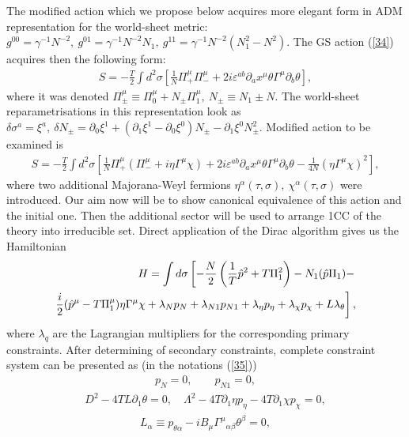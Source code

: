 \documentclass[a4paper]{article}
\begin{document}
The modified action which we propose below acquires more elegant form 
in ADM representation for the world-sheet metric: 
$g^{00}=\gamma^{-1}N^{-2}, ~ 
g^{01}=\gamma^{-1}N^{-2}N_1, ~
g^{11}=\gamma^{-1}N^{-2}(N_1^2-N^2)$. 
The GS action (\ref{34}) acquires then the
following form:
\begin{eqnarray}\label{42}
S=-\frac{T}{2}\int d^2\sigma
\left[\frac{1}{N}
\Pi_+^\mu \Pi_-^\mu+2i\varepsilon^{ab}\partial_ax^\mu
\theta\Gamma^\mu\partial_b\theta\right],
\end{eqnarray}
where it was denoted 
$\Pi^\mu_{\pm}\equiv\Pi_0^\mu+N_{\pm}\Pi_1^\mu, ~ 
N_{\pm}\equiv N_1\pm N$.
The world-sheet reparametrisations in this representation look as 
$\delta\sigma^a=\xi^a, ~  \delta N_{\pm}=\partial_0\xi^1+
(\partial_1\xi^1-
\partial_0\xi^0)N_{\pm}-\partial_1\xi^0N_{\pm}^2$. 
Modified action to be examined is
\begin{eqnarray}\label{44}
S=-\frac{T}{2}\int d^2\sigma
\left[\frac{1}{N}
\Pi_+^\mu (\Pi_-^\mu+i\eta\Gamma^\mu\chi)+
2i\varepsilon^{ab}\partial_ax^\mu
\theta\Gamma^\mu\partial_b\theta-\frac{1}{4N}
(\eta\Gamma^\mu\chi)^2\right],
\end{eqnarray}
where two additional Majorana-Weyl fermions
$\eta^\alpha(\tau, \sigma), ~ \chi^\alpha(\tau, \sigma)$ were introduced.
Our aim now will be to show canonical equivalence of this action and
the initial one. Then the additional sector will be used to arrange
1CC of the theory into irreducible set.
Direct application of the Dirac algorithm gives us the Hamiltonian
\begin{eqnarray}\label{45}
H=\int d\sigma\left[-\frac N2\left(\frac {1}{T} \hat p^2+
T\Pi_1^2\right)-N_1(\hat p\Pi_1)-\right. \cr
\left.\frac i2 (\hat p^\mu-T\Pi_1^\mu)\eta\Gamma^\mu\chi+
\lambda_N p_N+\lambda_{N1}p_{N1}+\lambda_\eta p_\eta+
\lambda_\chi p_\chi+L\lambda_\theta\right],
\end{eqnarray}
where $\lambda_q$ are the Lagrangian multipliers for the corresponding
primary constraints. After determining of secondary constraints, complete
constraint system can be presented as (in the notations
(\ref{35}))
\begin{eqnarray}\label{46}
p_N=0, \qquad p_{N1}=0,
\end{eqnarray}
\begin{eqnarray}\label{47}
D^2-4TL\partial_1\theta=0, \quad
\Lambda^2-4T\partial_1\eta p_\eta-4T\partial_1\chi p_\chi=0,
\end{eqnarray}
\begin{eqnarray}\label{48}
L_\alpha\equiv p_{\theta\alpha}- iB_\mu{\Gamma^\mu}_{\alpha\beta}
\theta^\beta=0,
\end{eqnarray}
\end{document}
